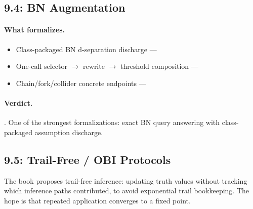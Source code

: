 \documentclass[11pt,openany]{report}
\begin{document}
\subsection{9.4: BN Augmentation}

\paragraph{What formalizes.}
\begin{itemize}
\item Class-packaged BN d-separation discharge ---
\item One-call selector $\to$ rewrite $\to$ threshold composition ---
\item Chain/fork/collider concrete endpoints ---
\end{itemize}

\paragraph{Verdict.}
\verdictClean{}.  One of the strongest formalizations: exact BN query
answering with class-packaged assumption discharge.

\subsection{9.5: Trail-Free / OBI Protocols}

The book proposes trail-free inference: updating truth values without
tracking which inference paths contributed, to avoid exponential trail
bookkeeping.  The hope is that repeated application converges to a
fixed point.
\end{document}

